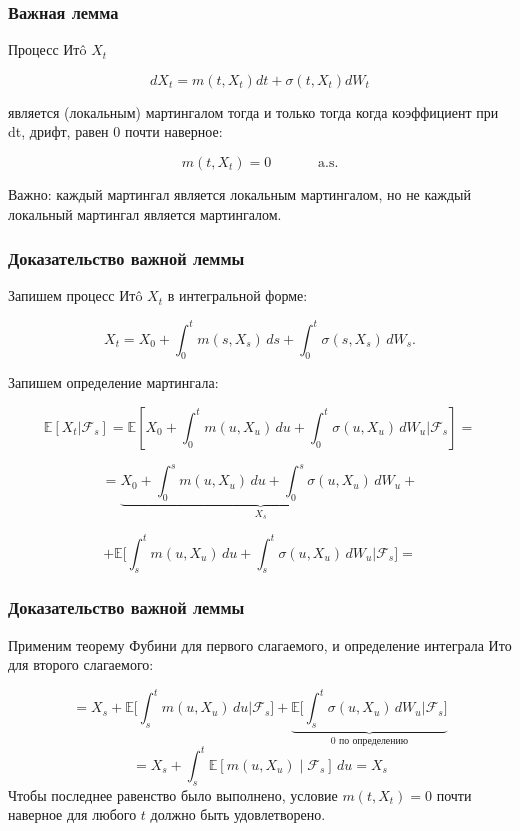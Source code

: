 \documentclass{beamer}
\begin{document}
\begin{frame}
\frametitle{Важная лемма}

Процесс Итô \(X_t\)

\[ dX_t = m(t, X_t) dt + \sigma(t, X_t) dW_t \]

является (локальным) мартингалом тогда и только тогда когда коэффициент при dt, дрифт, равен 0 почти наверное:

\[m(t, X_t) = 0 \quad \quad \quad \text{ a.s.}\]


Важно: каждый мартингал является локальным мартингалом, но не каждый локальный мартингал является мартингалом.

\end{frame}

\begin{frame}
\frametitle{Доказательство важной леммы}

Запишем процесс Итô \(X_t\) в интегральной форме: 

\[
X_t = X_0 + \int_0^t m(s, X_s) \, ds + \int_0^t \sigma(s, X_s) \, dW_s.
\]

Запишем определение мартингала:

\[
\mathbb{E}[X_t | \mathcal{F}_s] = \mathbb{E}\left[X_0 + \int_0^t m(u, X_u) \, du + \int_0^t \sigma(u, X_u) \, dW_u \bigg| \mathcal{F}_s\right] = 
\]

\[
= \underbrace{X_0 + \int_0^s m(u, X_u) \, du + \int_0^s \sigma(u, X_u) \, dW_u}_{X_s} +
\]

\[+ \mathbb{E}\bigg[\int_s^t m(u, X_u) \, du + \int_s^t \sigma(u, X_u) \, dW_u\bigg| \mathcal{F}_s\bigg] = 
\]

\end{frame}

\begin{frame}
\frametitle{Доказательство важной леммы}

Применим теорему Фубини для первого слагаемого, и определение интеграла Ито для второго слагаемого:

\[
= X_s + \mathbb{E}\bigg[ \int_s^t m(u, X_u) \, du \bigg| \mathcal{F}_s \bigg] + \underbrace{\mathbb{E}\bigg[\int_s^t \sigma(u, X_u) \, dW_u \bigg| \mathcal{F}_s \bigg]}_{0 \text{ по определению}} 
\]
\[
= X_s + \int_s^t \mathbb{E}[m(u, X_u) \mid \mathcal{F}_s] \, du = X_s
\]
Чтобы последнее равенство было выполнено, условие $m(t, X_t) = 0$ почти наверное для любого $t$ должно быть удовлетворено. 


\end{frame}
\end{document}
